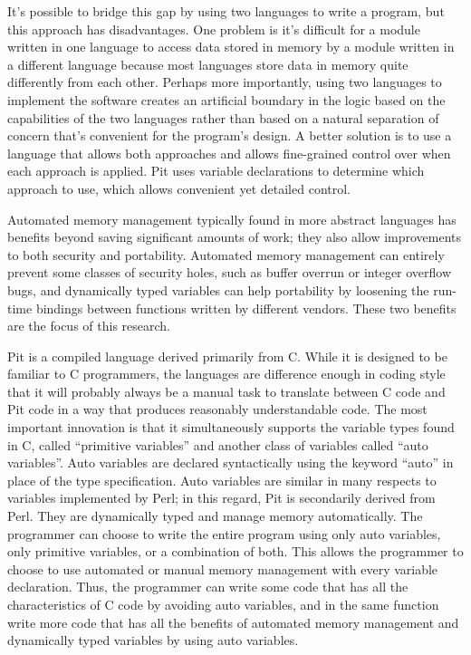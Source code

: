 It's possible to bridge this gap by using two languages to write a program, but this approach has disadvantages.  One
problem is it's difficult for a module written in one language to access data stored in memory by a module written in a
different language because most languages store data in memory quite differently from each other.  Perhaps more
importantly, using two languages to implement the software creates an artificial boundary in the logic based on the
capabilities of the two languages rather than based on a natural separation of concern that's convenient for the
program's design.  A better solution is to use a language that allows both approaches and allows fine-grained control
over when each approach is applied.  Pit uses variable declarations to determine which approach to use, which allows
convenient yet detailed control.

Automated memory management typically found in more abstract languages has benefits beyond saving significant amounts
of work; they also allow improvements to both security and portability.  Automated memory management can entirely
prevent some classes of security holes, such as buffer overrun\cite{1996alephone} or integer overflow\cite{2002blexim,2003ahmad} bugs,
and dynamically typed variables can help portability by loosening the run-time bindings between functions written by
different vendors.  These two benefits are the focus of this research.

Pit is a compiled language derived primarily from C.  While it is designed to be familiar to C programmers, the
languages are difference enough in coding style that it will probably always be a manual task to translate between C
code and Pit code in a way that produces reasonably understandable code.  The most important innovation is that it
simultaneously supports the variable types found in C, called ``primitive variables'' and another class of
variables called ``auto variables''.  Auto variables are declared syntactically using the keyword ``auto'' in place of
the type specification.  Auto variables are similar in many respects to variables implemented by Perl; in this regard,
Pit is secondarily derived from Perl.  They are dynamically typed and manage memory automatically.  The programmer can
choose to write the entire program using only auto variables, only primitive variables, or a combination of both.  This
allows the programmer to choose to use automated or manual memory management with every variable declaration.  Thus,
the programmer can write some code that has all the characteristics of C code by avoiding auto variables, and in the
same function write more code that has all the benefits of automated memory management and dynamically typed variables
by using auto variables.

